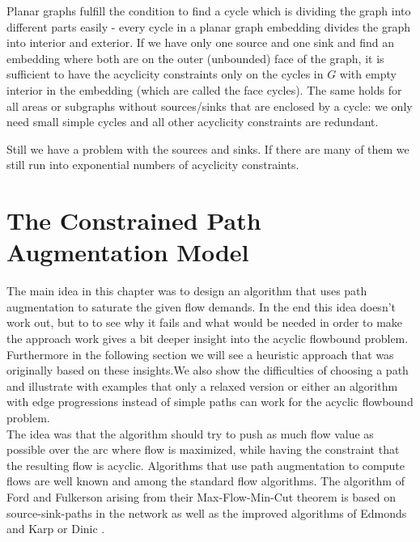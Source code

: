 Planar graphs fulfill the condition to find a 
cycle which is dividing the graph into different parts easily - every cycle in a planar graph embedding divides the 
graph into interior and exterior. If we have only one source and one sink and find an embedding where both are on the 
outer (unbounded) face of the graph, it is sufficient to have the acyclicity constraints only on the cycles in $G$ 
with empty interior in the embedding (which are called the face cycles). The same holds for all areas or subgraphs 
without sources/sinks that are enclosed by a cycle: we only need small simple cycles and all other acyclicity 
constraints are redundant.

Still we have a problem with the sources and sinks. If there are many of them we still run into exponential numbers of 
acyclicity constraints.

\newpage
\section{The Constrained Path Augmentation Model}%
\label{model:pathaugment}
The main idea in this chapter was to design an algorithm that uses path augmentation to saturate the given flow 
demands. In the end this idea doesn't work out, but to to see why it fails and what would be needed in order to make 
the approach work gives a bit deeper insight into the acyclic flowbound problem. Furthermore in the following section 
we will see a heuristic approach that was originally based on these insights.We also show the difficulties of choosing a 
path and illustrate with examples that only a relaxed version or either an algorithm with edge progressions instead of 
simple paths can work for the acyclic flowbound problem.\\

The idea was that the algorithm should try to push as much flow value as possible over the arc where flow is 
maximized, while having the 
constraint that the resulting flow is acyclic. %
Algorithms that use path augmentation to compute flows are well known and among the standard flow algorithms. The 
algorithm of Ford and Fulkerson \cite{Ford-Fulkerson_algo} arising from their Max-Flow-Min-Cut theorem is based on 
source-sink-paths in the network as well as the improved algorithms of Edmonds and Karp \cite{EdmondsKarp1972} or Dinic 
\cite{Dinic1970}. 

